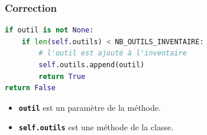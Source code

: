 \documentclass[svgnames,11pt]{beamer}
\begin{document}
\begin{frame}[fragile]
    \frametitle{Correction}

    \begin{center}
    \begin{lstlisting}[language=Python , basicstyle=\small, xleftmargin=2em, xrightmargin=2em]
if outil is not None:
    if len(self.outils) < NB_OUTILS_INVENTAIRE:
        # l'outil est ajouté à l'inventaire
        self.outils.append(outil)
        return True
return False
\end{lstlisting}
    \label{CODE}
    \end{center}
\begin{itemize}
    \item \textbf{\texttt{outil}} est un paramètre de la méthode.
    \item \textbf{\texttt{self.outils}} est une méthode de la classe.
\end{itemize}
\end{frame}
\end{document}
